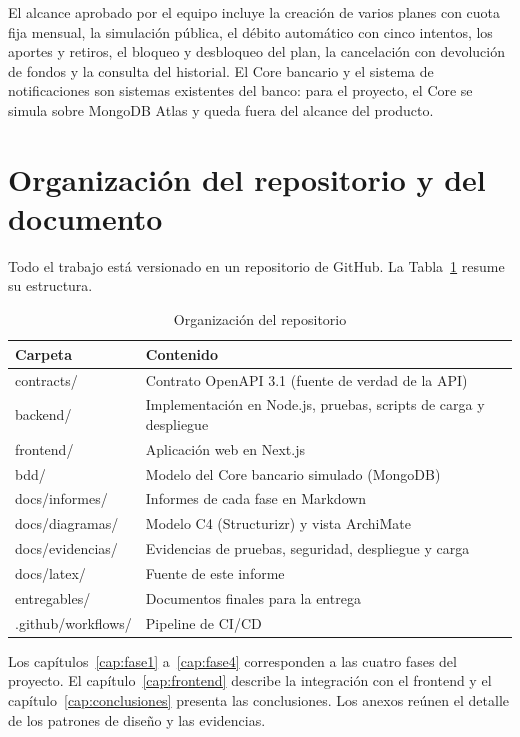 El alcance aprobado por el equipo incluye la creación de varios planes con cuota fija mensual, la simulación pública, el débito automático con cinco intentos, los aportes y retiros, el bloqueo y desbloqueo del plan, la cancelación con devolución de fondos y la consulta del historial. El Core bancario y el sistema de notificaciones son sistemas existentes del banco: para el proyecto, el Core se simula sobre MongoDB Atlas y queda fuera del alcance del producto.

\section{Organización del repositorio y del documento}

Todo el trabajo está versionado en un repositorio de GitHub. La Tabla~\ref{tab:repositorio} resume su estructura.

\begin{table}[H]
\centering
\caption{Organización del repositorio}\label{tab:repositorio}
\begin{tabularx}{\linewidth}{@{}>{\ttfamily}l X@{}}
\toprule
\normalfont\textbf{Carpeta} & \textbf{Contenido} \\
\midrule
contracts/ & Contrato OpenAPI 3.1 (fuente de verdad de la API) \\
backend/ & Implementación en Node.js, pruebas, scripts de carga y despliegue \\
frontend/ & Aplicación web en Next.js \\
bdd/ & Modelo del Core bancario simulado (MongoDB) \\
docs/informes/ & Informes de cada fase en Markdown \\
docs/diagramas/ & Modelo C4 (Structurizr) y vista ArchiMate \\
docs/evidencias/ & Evidencias de pruebas, seguridad, despliegue y carga \\
docs/latex/ & Fuente de este informe \\
entregables/ & Documentos finales para la entrega \\
.github/workflows/ & Pipeline de CI/CD \\
\bottomrule
\end{tabularx}
\end{table}

Los capítulos~\ref{cap:fase1} a~\ref{cap:fase4} corresponden a las cuatro fases del proyecto. El capítulo~\ref{cap:frontend} describe la integración con el frontend y el capítulo~\ref{cap:conclusiones} presenta las conclusiones. Los anexos reúnen el detalle de los patrones de diseño y las evidencias.
